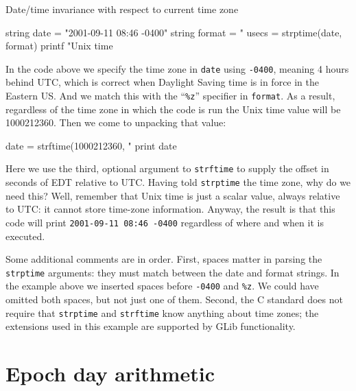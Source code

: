 \begin{script}[htbp]
  \caption{Date/time invariance with respect to current time zone}
  \label{ex:tzones}
\begin{scodebit}
string date = "2001-09-11 08:46 -0400"
string format = "%
usecs = strptime(date, format)
printf "Unix time %
\end{scodebit}
  In the code above we specify the time zone in \texttt{date} using
  \texttt{-0400}, meaning 4 hours behind UTC, which is correct when
  Daylight Saving time is in force in the Eastern US. And we match
  this with the ``\verb|%z|'' specifier in \texttt{format}. As a
  result, regardless of the time zone in which the code is run the
  Unix time value will be 1000212360. Then we come to unpacking that
  value:
\begin{scodebit}
date = strftime(1000212360, "%
print date
\end{scodebit}
  Here we use the third, optional argument to \texttt{strftime} to
  supply the offset in seconds of EDT relative to UTC. Having told
  \texttt{strptime} the time zone, why do we need this? Well, remember
  that Unix time is just a scalar value, always relative to UTC: it
  cannot store time-zone information. Anyway, the result is that this
  code will print \texttt{2001-09-11 08:46 -0400} regardless of where
  and when it is executed.

  \vspace{1ex} Some additional comments are in order. First, spaces
  matter in parsing the \texttt{strptime} arguments: they must match
  between the date and format strings. In the example above we
  inserted spaces before \verb|-0400| and \verb|%z|. We could have
  omitted both spaces, but not just one of them. Second, the
  \textsf{C} standard does not require that \texttt{strptime} and
  \texttt{strftime} know anything about time zones; the extensions
  used in this example are supported by \textsf{GLib} functionality.
\end{script}

\section{Epoch day arithmetic}
\label{sec:cal-arith}


